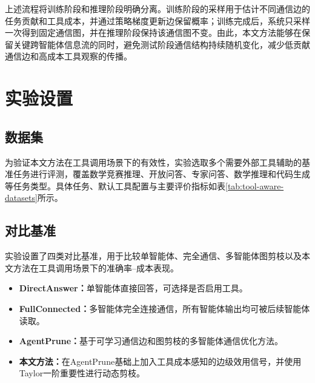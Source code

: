 上述流程将训练阶段和推理阶段明确分离。训练阶段的采样用于估计不同通信边的任务贡献和工具成本，并通过策略梯度更新边保留概率；训练完成后，系统只采样一次得到固定通信图，并在推理阶段保持该通信图不变。由此，本文方法能够在保留关键跨智能体信息流的同时，避免测试阶段通信结构持续随机变化，减少低贡献通信边和高成本工具观察的传播。

\section{实验设置}

\subsection{数据集}
为验证本文方法在工具调用场景下的有效性，实验选取多个需要外部工具辅助的基准任务进行评测，覆盖数学竞赛推理、开放问答、专家问答、数学推理和代码生成等任务类型。具体任务、默认工具配置与主要评价指标如表\ref{tab:tool-aware-datasets}所示。

\begin{table}[H]
  \centering
  \caption{工具调用实验任务与默认工具配置}
  \label{tab:tool-aware-datasets}
\end{table}

\subsection{对比基准}
实验设置了四类对比基准，用于比较单智能体、完全通信、多智能体图剪枝以及本文方法在工具调用场景下的准确率--成本表现。

\begin{itemize}[topsep=0pt,itemsep=0pt,parsep=0pt,partopsep=0pt]
  \item \textbf{DirectAnswer：}单智能体直接回答，可选择是否启用工具。
  \item \textbf{FullConnected：}多智能体完全连接通信，所有智能体输出均可被后续智能体读取。
  \item \textbf{AgentPrune：}基于可学习通信边和图剪枝的多智能体通信优化方法。
  \item \textbf{本文方法：}在AgentPrune基础上加入工具成本感知的边级效用信号，并使用Taylor一阶重要性进行动态剪枝。
\end{itemize}


